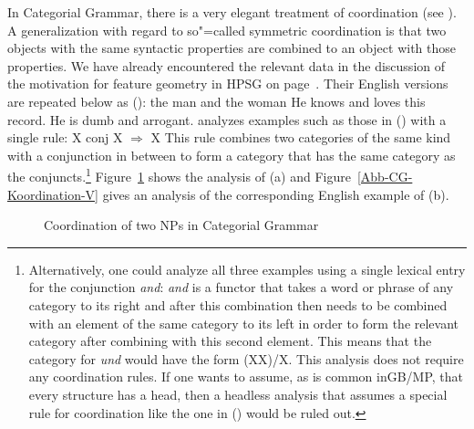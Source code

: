 \begin{exe}
\begin{xlist}[iv.]
\begin{exe}
\begin{xlist}[iv.]
In Categorial Grammar, there is a very elegant treatment of coordination (see \citealp{Steedman91a}). 
A generalization with regard to so"=called symmetric coordination is that two objects with the same syntactic properties are combined to an object
with those properties. We have already encountered the relevant data in the discussion of the motivation for feature geometry in HPSG on
page~\pageref{Seite-HPSG-Koordination}. Their English versions are repeated below as ():
\eal
\ex the man and the woman
\ex He knows and loves this record.
\ex He is dumb and arrogant.
\zl
\citet{Steedman91a} analyzes examples such as those in () with a single rule:
\ea
X conj X $\Rightarrow$ X
\z
\largerpage
This rule combines two categories of the same kind with a conjunction in between to form a category that has the same category as the conjuncts.\footnote{%
Alternatively, one could analyze all three examples using a single lexical entry for the conjunction
\emph{and}: \emph{and} is a functor that takes a word or phrase
of any category to its right and after this combination then needs to be combined with an element of the same category to its left in order to form the relevant
category after combining with this second element. This means that the category for \emph{und} would have the form (X\bs X)/X. 
This analysis does not require any coordination rules. If one wants to assume, as is common in\indexgb GB/MP\indexmp, that every structure has a head, then a headless
analysis that assumes a special rule for coordination like the one in () would be ruled out.
}
Figure~\ref{Abb-cg-np-koordination} shows the analysis of (a) and
Figure~\ref{Abb-CG-Koordination-V} gives an analysis of the corresponding English example of
(b).
\begin{figure}
\centerline{%
}
\caption{\label{Abb-cg-np-koordination}Coordination of two NPs in Categorial Grammar}
\end{figure}%


\end{xlist}
\end{exe}
\end{xlist}
\end{exe}
